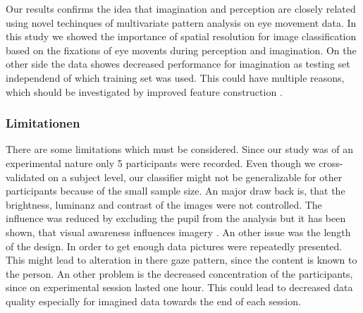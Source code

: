 \documentclass[a4paper,man,natbib,floatsintext]{apa6}
\begin{document}
Our results confirms the idea that imagination and perception are closely related using novel techinques of multivariate pattern analysis on eye movement data. In this study we showed the importance of spatial resolution for image classification based on the fixations of eye movents during perception and imagination. On the other side the data showes decreased performance for imagination as testing set independend of which training set was used. This could have multiple reasons, which should be investigated by improved feature construction  \citep{Johansson2006, Laeng2002}.

\subsubsection{Limitationen}
There are some limitations which must be considered. Since our study was of an experimental nature only 5 participants were recorded. Even though we cross-validated on a subject level, our classifier might not be generalizable for other participants because of the small sample size. 
An major draw back is, that the brightness, luminanz and contrast of the images were not controlled. The influence was reduced by excluding the pupil from the analysis but it has been shown, that visual awareness influences imagery \citep{Pearson2015}. An other issue was the length of the design. In order to get enough data pictures were repeatedly presented. This might lead to alteration in there gaze pattern, since the content is known to the person. An other problem is the decreased concentration of the participants, since on experimental session lasted one hour. This could lead to decreased data quality especially for imagined data towards the end of each session.
\end{document}
